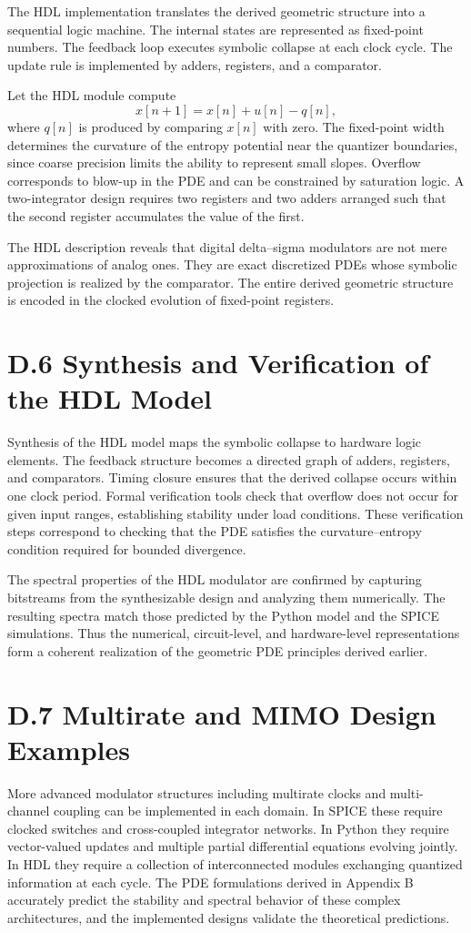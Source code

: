 The HDL implementation translates the derived geometric structure into a sequential logic machine. The internal states are represented as fixed-point numbers. The feedback loop executes symbolic collapse at each clock cycle. The update rule is implemented by adders, registers, and a comparator.

Let the HDL module compute
\[
x[n+1] = x[n] + u[n] - q[n],
\]
where \(q[n]\) is produced by comparing \(x[n]\) with zero. The fixed-point width determines the curvature of the entropy potential near the quantizer boundaries, since coarse precision limits the ability to represent small slopes. Overflow corresponds to blow-up in the PDE and can be constrained by saturation logic. A two-integrator design requires two registers and two adders arranged such that the second register accumulates the value of the first.

The HDL description reveals that digital delta–sigma modulators are not mere approximations of analog ones. They are exact discretized PDEs whose symbolic projection is realized by the comparator. The entire derived geometric structure is encoded in the clocked evolution of fixed-point registers.

\section{D.6 Synthesis and Verification of the HDL Model}

Synthesis of the HDL model maps the symbolic collapse to hardware logic elements. The feedback structure becomes a directed graph of adders, registers, and comparators. Timing closure ensures that the derived collapse occurs within one clock period. Formal verification tools check that overflow does not occur for given input ranges, establishing stability under load conditions. These verification steps correspond to checking that the PDE satisfies the curvature–entropy condition required for bounded divergence.

The spectral properties of the HDL modulator are confirmed by capturing bitstreams from the synthesizable design and analyzing them numerically. The resulting spectra match those predicted by the Python model and the SPICE simulations. Thus the numerical, circuit-level, and hardware-level representations form a coherent realization of the geometric PDE principles derived earlier.

\section{D.7 Multirate and MIMO Design Examples}

More advanced modulator structures including multirate clocks and multi-channel coupling can be implemented in each domain. In SPICE these require clocked switches and cross-coupled integrator networks. In Python they require vector-valued updates and multiple partial differential equations evolving jointly. In HDL they require a collection of interconnected modules exchanging quantized information at each cycle. The PDE formulations derived in Appendix B accurately predict the stability and spectral behavior of these complex architectures, and the implemented designs validate the theoretical predictions.
